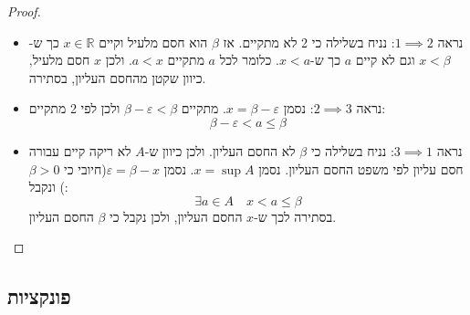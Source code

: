 \documentclass{tstextbook}
\begin{document}
\begin{proof}
  \begin{itemize}
    \item נראה \(1\implies 2\):
נניח בשלילה כי 2 לא מתקיים. אז \(\beta\) הוא חסם מלעיל וקיים \(x \in \mathbb{R}\) כך ש-\(x<\beta\) וגם לא קיים \(a\) כך ש-\(x<a\). כלומר לכל \(a\) מתקיים \(a<x\). ולכן \(x\) חסם מלעיל, כיוון שקטן מהחסם העליון, בסתירה.
    \item נראה \(2\implies 3\):
נסמן \(x=\beta-\varepsilon\). מתקיים \(\beta-\varepsilon<\beta\) ולכן לפי 2 מתקיים:
$$\beta-\varepsilon<a\leq \beta$$
    \item נראה \(3\implies 1\):
נניח בשלילה כי \(\beta\) לא החסם העליון. ולכן כיוון ש-\(A\) לא ריקה קיים עבורה חסם עליון לפי משפט החסם העליון. נסמן \(x = \sup A\). נסמן \(\varepsilon=\beta-x\)(חיובי כי \(\beta>0\)) ונקבל:
$$\exists a \in A\quad x<a\leq \beta$$
בסתירה לכך ש-\(x\) החסם העליון, ולכן נקבל כי \(\beta\) החסם העליון.
  \end{itemize}
\end{proof}
\subsection{פונקציות}
\end{document}
